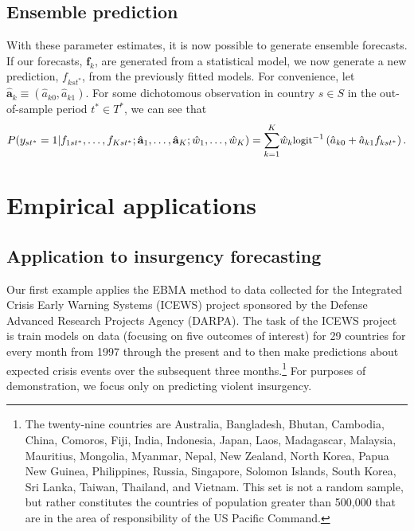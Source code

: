 \documentclass[pdftex,12pt,fullpage,oneside]{amsart}
\begin{document}
\subsection{Ensemble prediction}

With these parameter estimates, it is now possible to generate
ensemble forecasts. If our forecasts, $\mathbf{f}_k$, are generated
from a statistical model, we now generate a new prediction,
$f_{kst^\ast}$, from the previously fitted models. For convenience,
let $\hat{\mathbf{a}}_k \equiv (\hat{a}_{k0}, \hat{a}_{k1})$. For some
dichotomous observation in country $s\in S$ in the out-of-sample
period $t^\ast\in T^\ast$, we can see that
\begin{equation}
\label{nothing}
{\small
P(y_{st^*} = 1 | f_{1st^\ast}, \ldots, f_{Kst^\ast} ;  \hat{\mathbf{a}}_1,
 \ldots, \hat{\mathbf{a}}_K ; \hat{w}_1, \ldots, \hat{w}_K) =
 \overset{K}{\underset{k=1}{\sum}} \hat{w}_k
 \mbox{logit}^{-1}\left(\hat{a}_{k0} +  \hat{a}_{k1}f_{kst^\ast}\right).}
\end{equation}



\section{Empirical applications}

\subsection{Application to insurgency forecasting}

Our first example applies the EBMA method to data collected for the
Integrated Crisis Early Warning Systems (ICEWS) project sponsored by
the Defense Advanced Research Projects Agency (DARPA).  The task of
the ICEWS project is train models on data (focusing on five outcomes
of interest) for 29 countries for every month from 1997 through the
present and to then make predictions about expected crisis events over
the subsequent three months.\footnote{The twenty-nine countries are
  Australia, Bangladesh, Bhutan, Cambodia, China, Comoros, Fiji,
  India, Indonesia, Japan, Laos, Madagascar, Malaysia, Mauritius,
  Mongolia, Myanmar, Nepal, New Zealand, North Korea, Papua New
  Guinea, Philippines, Russia, Singapore, Solomon Islands, South
  Korea, Sri Lanka, Taiwan, Thailand, and Vietnam. This set is not a
  random sample, but rather constitutes the countries of population
  greater than 500,000 that are in the area of responsibility of the
  US Pacific Command.}  For purposes of demonstration, we focus only
on predicting violent insurgency.
\end{document}
